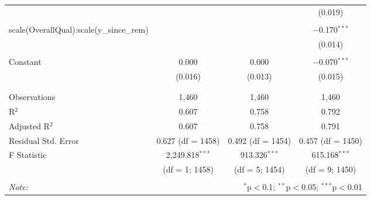 \documentclass{article}
\begin{document}
\begin{table}[!htbp]
\begin{tabular}{@{\extracolsep{5pt}}lccc}
  &  &  & (0.019) \\ 
  & & & \\ 
 scale(OverallQual):scale(y\_since\_rem) &  &  & $-$0.170$^{***}$ \\ 
  &  &  & (0.014) \\ 
  & & & \\ 
 Constant & 0.000 & 0.000 & $-$0.070$^{***}$ \\ 
  & (0.016) & (0.013) & (0.015) \\ 
  & & & \\ 
\hline \\[-1.8ex] 
Observations & 1,460 & 1,460 & 1,460 \\ 
R$^{2}$ & 0.607 & 0.758 & 0.792 \\ 
Adjusted R$^{2}$ & 0.607 & 0.758 & 0.791 \\ 
Residual Std. Error & 0.627 (df = 1458) & 0.492 (df = 1454) & 0.457 (df = 1450) \\ 
F Statistic & 2,249.818$^{***}$  & 913.326$^{***}$  & 615.168$^{***}$  \\ 
 & (df = 1; 1458) & (df = 5; 1454) & (df = 9; 1450) \\
\hline 
\hline \\[-1.8ex] 
\textit{Note:}  & \multicolumn{3}{r}{$^{*}$p$<$0.1; $^{**}$p$<$0.05; $^{***}$p$<$0.01} \\ 
\end{tabular} 
\end{table} 
\end{document}

